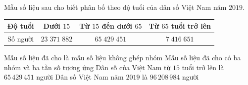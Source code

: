 \begin{ex}%
	Mẫu số liệu sau cho biết phân bố theo độ tuổi của dân số Việt  Nam năm $2019$.
	\begin{center}
		\begin{tabular}{|c|c|c|c|}
			 \hline
			Độ tuổi & Dưới $15$ & Từ $15$ đến dưới $65$ & Từ $65$ tuổi trở lên  \\
			\hline 
			Số người & $23\;371\;882$ &  $65\;429\;451$ & $7\;416\;651$ \\
			\hline 
		\end{tabular}
	\end{center}
	\choiceTF 
		{Mẫu số liệu đã cho là mẫu số liệu không ghép nhóm} 
		{\True Mẫu số liệu đã  cho có ba nhóm và ba tần số tương ứng}
		{Dân số của Việt Nam từ $15$ tuổi trở lên là $65\,429\,451$  người}
		{\True Dân số Việt  Nam năm $2019$ là $96\,208\,984$ người}
\end{ex}

